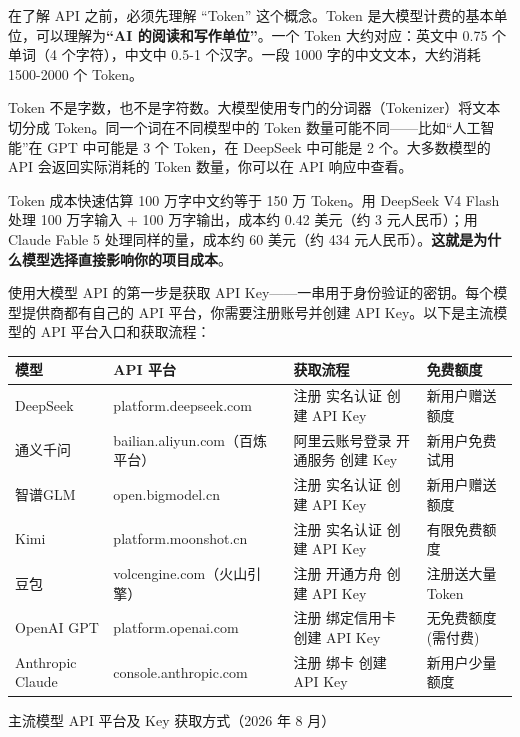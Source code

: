 
在了解 API 之前，必须先理解 “Token” 这个概念。Token 是大模型计费的基本单位，可以理解为\textbf{“AI 的阅读和写作单位”}。一个 Token 大约对应：英文中 0.75 个单词（4 个字符），中文中 0.5-1 个汉字。一段 1000 字的中文文本，大约消耗 1500-2000 个 Token。

Token 不是字数，也不是字符数。大模型使用专门的分词器（Tokenizer）将文本切分成 Token。同一个词在不同模型中的 Token 数量可能不同——比如“人工智能”在 GPT 中可能是 3 个 Token，在 DeepSeek 中可能是 2 个。大多数模型的 API 会返回实际消耗的 Token 数量，你可以在 API 响应中查看。

\begin{tcbinfo}{Token 成本快速估算}
100 万字中文约等于 150 万 Token。用 DeepSeek V4 Flash 处理 100 万字输入 + 100 万字输出，成本约 0.42 美元（约 3 元人民币）；用 Claude Fable 5 处理同样的量，成本约 60 美元（约 434 元人民币）。\textbf{这就是为什么模型选择直接影响你的项目成本}。

\end{tcbinfo}


使用大模型 API 的第一步是获取 API Key——一串用于身份验证的密钥。每个模型提供商都有自己的 API 平台，你需要注册账号并创建 API Key。以下是主流模型的 API 平台入口和获取流程：

\begin{center}
\begin{tabularx}{\linewidth}{|X|X|X|X|}
\hline
\textbf{模型} & \textbf{API 平台} & \textbf{获取流程} & \textbf{免费额度} \tabularnewline
\hline
DeepSeek & platform.deepseek.com & 注册 实名认证 创建 API Key & 新用户赠送额度 \tabularnewline
通义千问 & bailian.aliyun.com（百炼平台） & 阿里云账号登录 开通服务 创建 Key & 新用户免费试用 \tabularnewline
智谱GLM & open.bigmodel.cn & 注册 实名认证 创建 API Key & 新用户赠送额度 \tabularnewline
Kimi & platform.moonshot.cn & 注册 实名认证 创建 API Key & 有限免费额度 \tabularnewline
豆包 & volcengine.com（火山引擎） & 注册 开通方舟 创建 API Key & 注册送大量 Token \tabularnewline
OpenAI GPT & platform.openai.com & 注册 绑定信用卡 创建 API Key & 无免费额度(需付费) \tabularnewline
Anthropic Claude & console.anthropic.com & 注册 绑卡 创建 API Key & 新用户少量额度 \tabularnewline
\hline
\end{tabularx}
\end{center}

\begin{center}\small\color{gray}主流模型 API 平台及 Key 获取方式（2026 年 8 月）\end{center}

